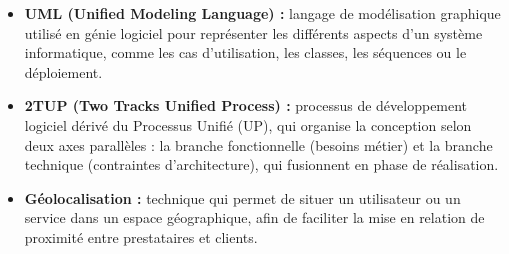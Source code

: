 \begin{itemize}
	\item[\textbf{-}] \textbf{UML (Unified Modeling Language) :} langage de modélisation graphique utilisé en génie logiciel pour représenter les différents aspects d'un système informatique, comme les cas d'utilisation, les classes, les séquences ou le déploiement.
	
	\item[\textbf{-}] \textbf{2TUP (Two Tracks Unified Process) :} processus de développement logiciel dérivé du Processus Unifié (UP), qui organise la conception selon deux axes parallèles : la branche fonctionnelle (besoins métier) et la branche technique (contraintes d'architecture), qui fusionnent en phase de réalisation.
	
	\item[\textbf{-}] \textbf{Géolocalisation :} technique qui permet de situer un utilisateur ou un service dans un espace géographique, afin de faciliter la mise en relation de proximité entre prestataires et clients.
\end{itemize}